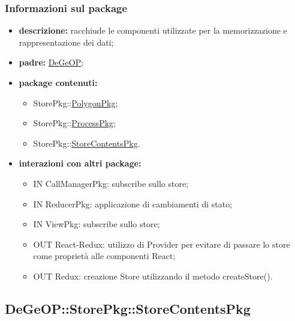 \subsubsection{Informazioni sul package}
\begin{itemize}
	\item \textbf{descrizione:} racchiude le componenti utilizzate per la memorizzazione e rappresentazione dei dati;
	\item \textbf{padre:} \hyperref[pkg::DeGeOP]{DeGeOP};
	\item \textbf{package contenuti:}
	\begin{itemize}
		\item StorePkg::\hyperref[pkg::PolygonPkg]{PolygonPkg};
		\item StorePkg::\hyperref[pkg::ProcessPkg]{ProcessPkg};
		\item StorePkg::\hyperref[pkg::StoreContentsPkg]{StoreContentsPkg}.
	\end{itemize}
	\item \textbf{interazioni con altri package:} 
	\begin{itemize}
		\item IN CallManagerPkg: subscribe sullo store;
		\item IN ReducerPkg: applicazione di cambiamenti di stato;
		\item IN ViewPkg: subscribe sullo store;
		\item OUT React-Redux: utilizzo di Provider per evitare di passare lo store come proprietà alle componenti React;
		\item OUT Redux: creazione Store utilizzando il metodo createStore().
	\end{itemize}
\end{itemize}
\newpage
\subsection{DeGeOP::StorePkg::StoreContentsPkg}
\label{pkg::StoreContentsPkg}
